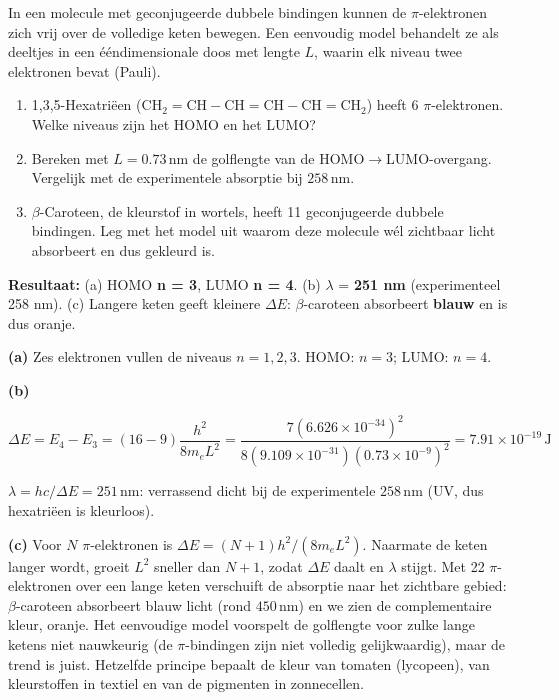 \begin{oefening}
In een molecule met geconjugeerde dubbele bindingen kunnen de \ensuremath{\pi{}}-elektronen zich vrij over de volledige keten bewegen. Een eenvoudig model behandelt ze als deeltjes in een ééndimensionale doos met lengte \(L\), waarin elk niveau twee elektronen bevat (Pauli).

\begin{enumerate}
\item[(a)]
  1,3,5-Hexatriëen (\(\mathrm{CH_2{=}CH{-}CH{=}CH{-}CH{=}CH_2}\)) heeft 6 \ensuremath{\pi{}}-elektronen. Welke niveaus zijn het HOMO en het LUMO?
\item[(b)]
  Bereken met \(L = 0.73\,\mathrm{nm}\) de golflengte van de HOMO\ensuremath{\rightarrow{}}LUMO-overgang. Vergelijk met de experimentele absorptie bij \(258\,\mathrm{nm}\).
\item[(c)]
  \ensuremath{\beta{}}-Caroteen, de kleurstof in wortels, heeft 11 geconjugeerde dubbele bindingen. Leg met het model uit waarom deze molecule wél zichtbaar licht absorbeert en dus gekleurd is.
\end{enumerate}
\end{oefening}
\begin{oplossing}
\textbf{Resultaat:} (a) HOMO \textbf{n = 3}, LUMO \textbf{n = 4}. (b) \(\lambda\) = \textbf{251 nm} (experimenteel 258 nm). (c) Langere keten geeft kleinere \(\Delta E\): \ensuremath{\beta{}}-caroteen absorbeert \textbf{blauw} en is dus oranje.

\textbf{(a)} Zes elektronen vullen de niveaus \(n = 1, 2, 3\). HOMO: \(n = 3\); LUMO: \(n = 4\).

\textbf{(b)}

\[
\Delta E = E_4 - E_3 = (16 - 9)\frac{h^2}{8m_eL^2} = \frac{7(6.626\times10^{-34})^2}{8(9.109\times10^{-31})(0.73\times10^{-9})^2} = 7.91\times10^{-19}\,\mathrm{J}
\]

\(\lambda = hc/\Delta E = 251\,\mathrm{nm}\): verrassend dicht bij de experimentele \(258\,\mathrm{nm}\) (UV, dus hexatriëen is kleurloos).

\textbf{(c)} Voor \(N\) \ensuremath{\pi{}}-elektronen is \(\Delta E = (N+1)h^2/(8m_eL^2)\). Naarmate de keten langer wordt, groeit \(L^2\) sneller dan \(N+1\), zodat \(\Delta E\) daalt en \(\lambda\) stijgt. Met 22 \ensuremath{\pi{}}-elektronen over een lange keten verschuift de absorptie naar het zichtbare gebied: \ensuremath{\beta{}}-caroteen absorbeert blauw licht (rond \(450\,\mathrm{nm}\)) en we zien de complementaire kleur, oranje. Het eenvoudige model voorspelt de golflengte voor zulke lange ketens niet nauwkeurig (de \ensuremath{\pi{}}-bindingen zijn niet volledig gelijkwaardig), maar de trend is juist. Hetzelfde principe bepaalt de kleur van tomaten (lycopeen), van kleurstoffen in textiel en van de pigmenten in zonnecellen.
\end{oplossing}

